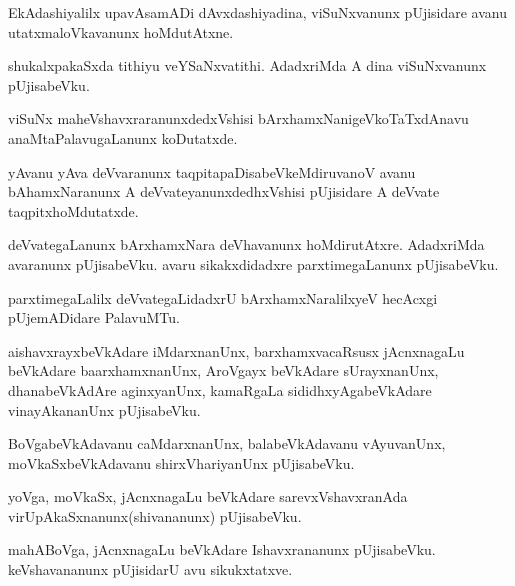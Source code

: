 \documentclass{article}
\begin{document}
\begin{mn}
EkAdashiyalilx upavAsamADi dAvxdashiyadina, viSuNxvanunx pUjisidare avanu 
utatxmaloVkavanunx hoMdutAtxne.
\end{mn}

\begin{mn}
shukalxpakaSxda  tithiyu veYSaNxvatithi. AdadxriMda A dina viSuNxvanunx pUjisabeVku.
\end{mn}

\begin{mn}
viSuNx maheVshavxraranunxdedxVshisi bArxhamxNanigeVkoTaTxdAnavu anaMtaPalavugaLanunx koDutatxde.
\end{mn}

\begin{mn}
yAvanu yAva deVvaranunx taqpitapaDisabeVkeMdiruvanoV avanu bAhamxNaranunx A 
deVvateyanunxdedhxVshisi pUjisidare A deVvate taqpitxhoMdutatxde. 
\end{mn}

\begin{mn}
deVvategaLanunx bArxhamxNara deVhavanunx hoMdirutAtxre. AdadxriMda avaranunx pUjisabeVku. avaru 
sikakxdidadxre parxtimegaLanunx pUjisabeVku.
\end{mn}

\begin{mn}
parxtimegaLalilx deVvategaLidadxrU bArxhamxNaralilxyeV hecAcxgi pUjemADidare PalavuMTu.
\end{mn}

\begin{mn}
aishavxrayxbeVkAdare iMdarxnanUnx, barxhamxvacaRsusx jAcnxnagaLu beVkAdare baarxhamxnanUnx, 
AroVgayx beVkAdare sUrayxnanUnx, dhanabeVkAdAre aginxyanUnx, kamaRgaLa sididhxyAgabeVkAdare 
vinayAkananUnx pUjisabeVku.
\end{mn}

\begin{mn}
BoVgabeVkAdavanu caMdarxnanUnx, balabeVkAdavanu vAyuvanUnx, moVkaSxbeVkAdavanu shirxVhariyanUnx 
pUjisabeVku.
\end{mn}

\begin{mn}
yoVga, moVkaSx, jAcnxnagaLu beVkAdare sarevxVshavxranAda virUpAkaSxnanunx(shivananunx)
pUjisabeVku.
\end{mn}

\begin{mn}
mahABoVga, jAcnxnagaLu beVkAdare Ishavxrananunx pUjisabeVku. keVshavananunx pUjisidarU avu 
sikukxtatxve.
\end{mn}
\end{document}
